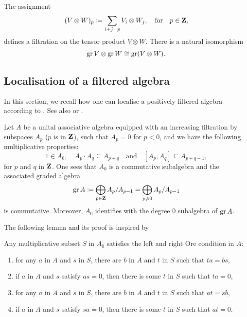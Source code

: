 The assignment
\[ (V \otimes W)_p \coloneqq \sum_{i + j = p} V_i \otimes W_j, \quad \text{for} \quad p \in \mathbf{Z}, \]
defines a filtration on the tensor product $V \otimes W$. There is a natural isomorphism
\[ \operatorname{gr} V \otimes \operatorname{gr} W \cong \operatorname{gr}(V \otimes W). \]

\subsection{Localisation of a filtered algebra} \label{subsectin:localisation-filtered}


In this section, we recall how one can localise a positively filtered algebra according to \cite[Section 2.1]{kapranov1998noncommutative}. See also \cite[Section 6]{kamnitzer2022hamiltonian} or \cite{skoda2006noncommutative}.


Let $A$ be a unital associative algebra equipped with an increasing filtration by subspaces $A_p$ ($p$ is in $\mathbf{Z}$), such that $A_p = 0$ for $p < 0$, and we have the following multiplicative properties:
\begin{equation} \label{equation:multiplicative-properties} 1 \in A_0, \quad A_p \cdot A_q \subseteq A_{p + q} \quad \text{and} \quad [A_p, A_q] \subseteq A_{p + q - 1}, \end{equation}
for $p$ and $q$ in $\mathbf{Z}$. One sees that $A_0$ is a commutative subalgebra and the associated graded algebra
\[ \operatorname{gr} A \coloneqq \bigoplus_{p \in \mathbf{Z}} A_p / A_{p - 1} = \bigoplus_{p \geqslant 0} A_p / A_{p - 1} \]
is commutative. Moreover, $A_0$ identifies with the degree $0$ subalgebra of $\operatorname{gr} A$.  %

The following lemma and its proof is inspired by \cite[Proposition 2.1.5]{kapranov1998noncommutative}

\begin{lemma} \label{lemma:ore}
	Any multiplicative subset $S$ in $A_0$ satisfies the left and right Ore condition in $A$:
	\begin{enumerate}
		\item \label{lemma:ore,item:left-frac} for any $a$ in $A$ and $s$ in $S$, there are $b$ in $A$ and $t$ in $S$ such that $t a = b s$,
		
		\item \label{lemma:ore,item:left-zero} if $a$ in $A$ and $s$ satisfy $a s = 0$, then there is some $t$ in $S$ such that $t a = 0$,
		
		\item for any $a$ in $A$ and $s$ in $S$, there are $b$ in $A$ and $t$ in $S$ such that $a t = s b$,
		
		\item if $a$ in $A$ and $s$ satisfy $s a = 0$, then there is some $t$ in $S$ such that $a t = 0$.
	\end{enumerate}
\end{lemma}

